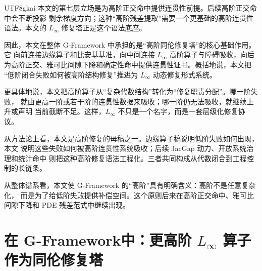 \documentclass[12pt]{article}
\newcommand{\GFramework}{\textsf{G-Framework}}
\begin{document}
\begin{CJK*}{UTF8}{gkai}
本文的第七层立场是为高阶正交命中提供连贯性前提。后续高阶正交命中会不断投影
剩余梯度方向；这种“高阶残差提取”需要一个更基础的高阶连贯性语法。本文的
\(L_\infty\) 修复塔正是这个语法底座。

因此，本文在整体 \GFramework{} 中承担的是“高阶同伦修复塔”的核心基础作用。它
向前连接边缘算子和比安基基准，向中间连接 \(L_\infty\) 高阶算子与障碍吸收，向后
为高阶正交、雅可比间隙下降和确定性命中提供连贯性证书。概括地说，本文把
“低阶闭合失败如何被高阶结构修复”推进为 \(L_\infty\) 动态修复形式系统。

更具体地说，本文把高阶算子从“复杂代数结构”转化为“修复职责分配”。哪一阶失败，
就由更高一阶或若干阶的连贯性数据来吸收；哪一阶仍无法吸收，就继续上升或声明
当前截断不足。这样，\(L_\infty\) 不只是一个名字，而是一套层级化修复协议。

从方法论上看，本文是高阶修复的母稿之一。边缘算子稿说明低阶失败如何出现，本文
说明这些失败如何被高阶连贯性系统吸收；后续 JacGap 动力、开放系统治理和统计命中
则把这种高阶修复语法工程化。三者共同构成从代数闭合到工程控制的长链条。

从整体谱系看，本文使 \GFramework{} 的“高阶”具有明确含义：高阶不是任意复杂化，
而是为了给低阶失败提供补偿空间。这个原则后来在高阶正交命中、雅可比间隙下降和
PDE 残差范式中继续出现。

\setcounter{tocdepth}{3}
\setcounter{secnumdepth}{3}
\tableofcontents
\clearpage

\section[更高阶 $L_\infty$ 算子作为同伦修复塔]
{在 \GFramework 中：更高阶 $L_\infty$ 算子作为同伦修复塔}
\label{chap:linfty-homotopy-repair-tower}


\end{CJK*}
\end{document}
